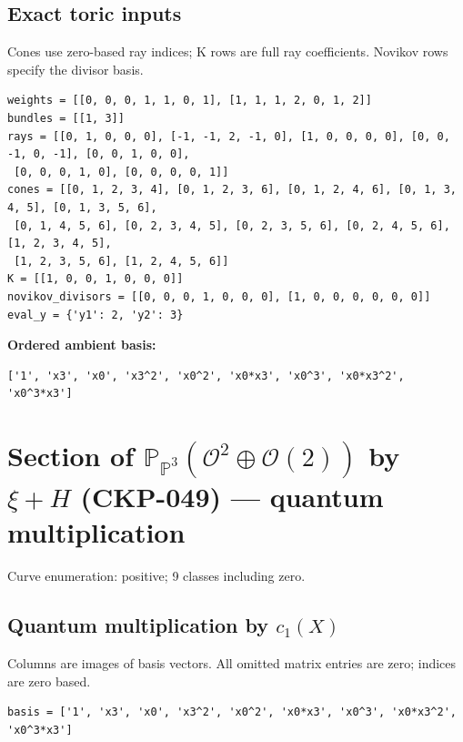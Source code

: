 \documentclass[10pt,a4paper]{article}
\begin{document}
\subsection*{Exact toric inputs}
Cones use zero-based ray indices; K rows are full ray coefficients. Novikov rows specify the divisor basis.

\begin{lstlisting}
weights = [[0, 0, 0, 1, 1, 0, 1], [1, 1, 1, 2, 0, 1, 2]]
bundles = [[1, 3]]
rays = [[0, 1, 0, 0, 0], [-1, -1, 2, -1, 0], [1, 0, 0, 0, 0], [0, 0, -1, 0, -1], [0, 0, 1, 0, 0],
 [0, 0, 0, 1, 0], [0, 0, 0, 0, 1]]
cones = [[0, 1, 2, 3, 4], [0, 1, 2, 3, 6], [0, 1, 2, 4, 6], [0, 1, 3, 4, 5], [0, 1, 3, 5, 6],
 [0, 1, 4, 5, 6], [0, 2, 3, 4, 5], [0, 2, 3, 5, 6], [0, 2, 4, 5, 6], [1, 2, 3, 4, 5],
 [1, 2, 3, 5, 6], [1, 2, 4, 5, 6]]
K = [[1, 0, 0, 1, 0, 0, 0]]
novikov_divisors = [[0, 0, 0, 1, 0, 0, 0], [1, 0, 0, 0, 0, 0, 0]]
eval_y = {'y1': 2, 'y2': 3}
\end{lstlisting}

\textbf{Ordered ambient basis:}
\begin{lstlisting}
['1', 'x3', 'x0', 'x3^2', 'x0^2', 'x0*x3', 'x0^3', 'x0*x3^2', 'x0^3*x3']
\end{lstlisting}

\clearpage\section*{Section of $\mathbb P_{\mathbb P^{3}}(\mathcal O^{2}\oplus \mathcal O(2))$ by $\xi +H$ (CKP-049) --- quantum multiplication}

Curve enumeration: positive; 9 classes including zero.
\subsection*{Quantum multiplication by $c_1(X)$}
Columns are images of basis vectors. All omitted matrix entries are zero; indices are zero based.

\begin{lstlisting}
basis = ['1', 'x3', 'x0', 'x3^2', 'x0^2', 'x0*x3', 'x0^3', 'x0*x3^2', 'x0^3*x3']
\end{lstlisting}
\end{document}
